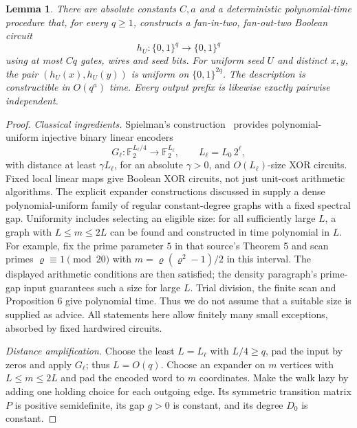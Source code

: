 \documentclass[11pt]{article}
\newtheorem{lemma}[theorem]{Lemma}
\theoremstyle{remark}
\newcommand{\F}{\mathbb F_2}
\begin{document}
\begin{lemma}\label{lem:hash}
There are absolute constants \(C,a\) and a deterministic
polynomial-time procedure that, for every \(q\ge1\), constructs a
fan-in-two, fan-out-two Boolean circuit
\[
 h_U:\{0,1\}^q\longrightarrow\{0,1\}^q
\]
using at most \(Cq\) gates, wires and seed bits. For uniform seed \(U\)
and distinct \(x,y\), the pair \((h_U(x),h_U(y))\) is uniform on
\(\{0,1\}^{2q}\). The description is constructible in \(O(q^a)\)
time. Every output prefix is likewise exactly pairwise independent.
\end{lemma}
\begin{proof}
\emph{Classical ingredients.}
Spielman's construction~\cite[Lemma 2 and Theorem 19]{spielman1996}
provides polynomial-uniform injective binary linear encoders
\[
 G_\ell:\F^{L_\ell/4}\longrightarrow\F^{L_\ell},
 \qquad L_\ell=L_0\,2^\ell,
\]
with distance at least \(\gamma L_\ell\), for an absolute
\(\gamma>0\), and \(O(L_\ell)\)-size XOR circuits.
Fixed local linear maps give Boolean XOR circuits, not just
unit-cost arithmetic algorithms.
The explicit expander constructions discussed in
\cite[Section 3, especially Proposition 6, Definition 9 and the
following density paragraph]{spielman1996} supply a dense
polynomial-uniform family of regular constant-degree graphs
with a fixed spectral gap.
Uniformity includes selecting an eligible size: for all sufficiently
large \(L\), a graph with \(L\le m\le2L\) can be found and
constructed in time polynomial in \(L\). For example, fix the prime
parameter \(5\) in that source's Theorem 5 and scan primes
\(\varrho\equiv1\pmod{20}\) with \(m=\varrho(\varrho^2-1)/2\) in this
interval.
The displayed arithmetic conditions are then satisfied; the density
paragraph's prime-gap input guarantees such a size for large \(L\).
Trial division, the finite scan and Proposition 6 give polynomial time.
Thus we do not assume that a suitable size is supplied as advice.
All statements here allow finitely many small exceptions, absorbed
by fixed hardwired circuits.

\emph{Distance amplification.}
Choose the least \(L=L_\ell\) with \(L/4\ge q\), pad the input by
zeros and apply \(G_\ell\); thus \(L=O(q)\).
Choose an expander on \(m\) vertices with \(L\le m\le2L\)
and pad the encoded word to \(m\) coordinates.
Make the walk lazy by adding one holding choice for each outgoing
edge. Its symmetric transition matrix \(P\) is positive
semidefinite, its gap \(g>0\) is constant, and its degree \(D_0\)
is constant.


\end{proof}
\end{document}
